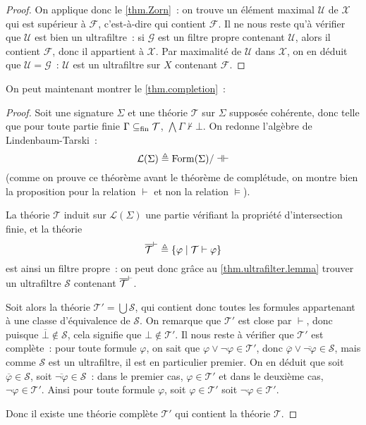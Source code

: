 \begin{proof}
  On applique donc le \cref{thm.Zorn}~: on trouve un élément maximal
  $\mathcal U$ de $\mathcal X$ qui est supérieur à $\mathcal F$, c'est-à-dire
  qui contient $\mathcal F$. Il ne nous reste qu'à vérifier que $\mathcal U$ est
  bien un ultrafiltre~: si $\mathcal G$ est un filtre propre contenant
  $\mathcal U$, alors il contient $\mathcal F$, donc il appartient à
  $\mathcal X$. Par maximalité de $\mathcal U$ dans $\mathcal X$, on en déduit
  que $\mathcal U = \mathcal G$~: $\mathcal U$ est un ultrafiltre sur $X$
  contenant $\mathcal F$.
\end{proof}

On peut maintenant montrer le \cref{thm.completion}~:

\begin{proof}
  Soit une signature $\Sigma$ et une théorie $\mathcal T$ sur $\Sigma$ supposée
  cohérente, donc telle que pour toute partie finie $\Gamma\subseteq_{\mathrm{fin}} \mathcal T$,
  $\bigwedge \Gamma \nvdash \bot$. On redonne l'algèbre de Lindenbaum-Tarski~:
  \[\mathcal L(\Sigma) \triangleq \operatorname{Form}(\Sigma)/\dashv\vdash\]
  (comme on prouve ce théorème avant le théorème de complétude, on montre bien
  la proposition pour la relation $\vdash$ et non la relation $\vDash$).

  La théorie $\mathcal T$ induit sur $\mathcal L(\Sigma)$ une partie vérifiant
  la propriété d'intersection finie, et la théorie
  \[\overline{\mathcal T}^{\vdash} \triangleq \{\varphi\mid \mathcal T \vdash \varphi\}\]
  est ainsi un filtre propre~: on peut donc grâce au
  \cref{thm.ultrafilter.lemma} trouver un ultrafiltre $\mathcal S$ contenant
  $\overline{\mathcal T}^{\vdash}$.

  Soit alors la théorie $\mathcal T' = \bigcup\mathcal S$, qui contient donc
  toutes les formules appartenant à une classe d'équivalence de $\mathcal S$.
  On remarque que $\mathcal T'$ est close par $\vdash$, donc puisque
  $\overline\bot \notin\mathcal S$, cela signifie que $\bot\notin\mathcal T'$.
  Il nous reste à vérifier que $\mathcal T'$ est complète~: pour toute
  formule $\varphi$, on sait que $\varphi\lor\lnot\varphi \in \mathcal T'$, donc
  $\overline{\varphi}\lor\overline{\lnot\varphi}\in\mathcal S$, mais
  comme $\mathcal S$ est un ultrafiltre, il est en particulier premier. On
  en déduit que soit $\overline\varphi \in \mathcal S$, soit
  $\overline{\lnot\varphi}\in \mathcal S$~: dans le premier cas,
  $\varphi\in \mathcal T'$ et dans le deuxième cas,
  $\lnot\varphi\in \mathcal T'$. Ainsi pour toute formule $\varphi$, soit
  $\varphi\in \mathcal T'$ soit $\lnot\varphi\in \mathcal T'$.

  Donc il existe une théorie complète $\mathcal T'$ qui contient la théorie
  $\mathcal T$.
\end{proof}

